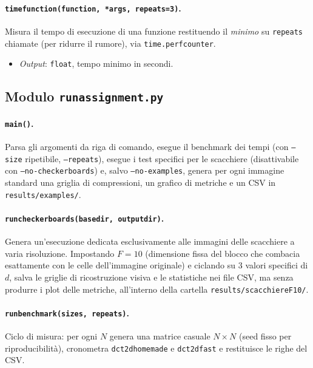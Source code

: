\documentclass[11pt,a4paper]{article}
\makeatletter
\let\@origtexttt\texttt
\renewcommand{\texttt}[1]{{\def\_{\textunderscore\discretionary{}{}{}}\@origtexttt{#1}}}
\makeatother
\begin{document}
\paragraph{\texttt{time\_function(function, *args, repeats=3)}.}
Misura il tempo di esecuzione di una funzione restituendo il \emph{minimo} su
\texttt{repeats} chiamate (per ridurre il rumore), via
\texttt{time.perf\_counter}.
\begin{itemize}
  \item \emph{Output}: \texttt{float}, tempo minimo in secondi.
\end{itemize}

\subsection{Modulo \texttt{run\_assignment.py}}

\paragraph{\texttt{main()}.}
Parsa gli argomenti da riga di comando, esegue il benchmark dei tempi (con
\texttt{--size} ripetibile, \texttt{--repeats}), esegue i test specifici per le scacchiere
(disattivabile con \texttt{--no-checkerboards}) e, salvo \texttt{--no-examples},
genera per ogni immagine standard una griglia di compressioni, un grafico di metriche e
un CSV in \texttt{results/examples/}.

\paragraph{\texttt{run\_checkerboards(base\_dir, output\_dir)}.}
Genera un'esecuzione dedicata esclusivamente alle immagini delle scacchiere a varia
risoluzione. Impostando $F=10$ (dimensione fissa del blocco che combacia esattamente con
le celle dell'immagine originale) e ciclando su 3 valori specifici di $d$,
salva le griglie di ricostruzione visiva e le statistiche nei file CSV, ma senza produrre
i plot delle metriche, all'interno della cartella \texttt{results/scacchiere\_F10/}.

\paragraph{\texttt{run\_benchmark(sizes, repeats)}.}
Ciclo di misura: per ogni $N$ genera una matrice casuale $N\times N$ (seed
fisso per riproducibilità), cronometra \texttt{dct\_2d\_homemade} e
\texttt{dct\_2d\_fast} e restituisce le righe del CSV.
\end{document}
